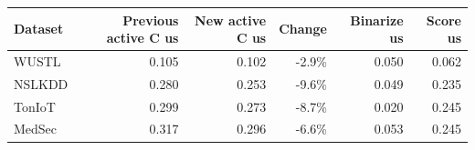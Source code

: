 \begin{tabular}{lrrrrr}
\toprule
Dataset & Previous active C us & New active C us & Change & Binarize us & Score us \\
\midrule
WUSTL & 0.105 & 0.102 & -2.9\% & 0.050 & 0.062 \\
NSLKDD & 0.280 & 0.253 & -9.6\% & 0.049 & 0.235 \\
TonIoT & 0.299 & 0.273 & -8.7\% & 0.020 & 0.245 \\
MedSec & 0.317 & 0.296 & -6.6\% & 0.053 & 0.245 \\
\bottomrule
\end{tabular}
